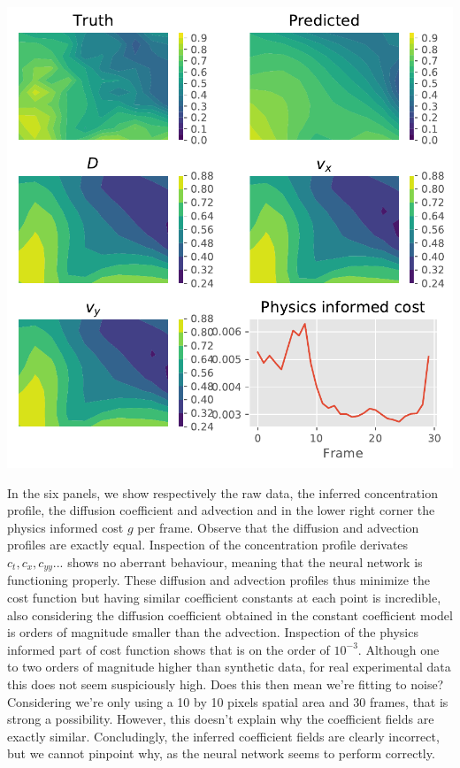 \documentclass{Dissertate}
\let\origfigure\figure
\let\endorigfigure\endfigure
\renewenvironment{figure}[1][2] {
    \expandafter\origfigure\expandafter[H]
} {
    \endorigfigure
}
\begin{document}
\begin{figure}
\hypertarget{fig:nnfull}{%
\centering
\includegraphics{source/figures/pdf/NN_Man_full.pdf}
\caption{Caption.}\label{fig:nnfull}
}
\end{figure}

In the six panels, we show respectively the raw data, the inferred
concentration profile, the diffusion coefficient and advection and in
the lower right corner the physics informed cost \(g\) per frame.
Observe that the diffusion and advection profiles are exactly equal.
Inspection of the concentration profile derivates
\(c_t, c_x, c_{yy}...\) shows no aberrant behaviour, meaning that the
neural network is functioning properly. These diffusion and advection
profiles thus minimize the cost function but having similar coefficient
constants at each point is incredible, also considering the diffusion
coefficient obtained in the constant coefficient model is orders of
magnitude smaller than the advection. Inspection of the physics informed
part of cost function shows that is on the order of \(10^{-3}\).
Although one to two orders of magnitude higher than synthetic data, for
real experimental data this does not seem suspiciously high. Does this
then mean we're fitting to noise? Considering we're only using a 10 by
10 pixels spatial area and 30 frames, that is strong a possibility.
However, this doesn't explain why the coefficient fields are exactly
similar. Concludingly, the inferred coefficient fields are clearly
incorrect, but we cannot pinpoint why, as the neural network seems to
perform correctly.
\end{document}
